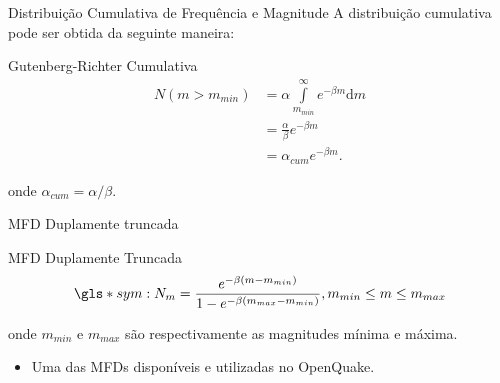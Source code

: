 \documentclass[ucs,8pt]{beamer}
\begin{document}
\begin{frame}{Distribuição Cumulativa de Frequência e Magnitude}
A distribuição \alert{cumulativa} pode ser obtida da seguinte maneira: 
	\begin{block}{Gutenberg-Richter Cumulativa}
		\begin{equation}
			\begin{split}
				N(m > m_{min}) &= \alpha \int\limits_{m_{min}}^{\infty}e^{-\beta m}\mathrm{d}m \\
							   &= \frac{\alpha}{\beta} e^{-\beta m} \\
							   &= \alpha_{cum} e^{-\beta m}.
			\end{split}
			\label{eq:gr_cum}
		\end{equation}
	\end{block}
	onde $\alpha_{cum} = \alpha / \beta $.
\end{frame}


\begin{frame}{MFD Duplamente truncada}
	\begin{block}{MFD Duplamente Truncada}
	\begin{equation}
			\gls*{sym:N_m} = \frac{e^{-\beta (m - m_{min})}}{1 -e^{-\beta (m_{max} - m_{min}) } } , m_{min} \leq m \leq m_{max}
		\label{eq:gr_dtr}
	\end{equation}
	\end{block}
	onde $m_{min}$ e $m_{max}$ são respectivamente as magnitudes mínima e máxima.

	\begin{itemize}
	  \item Uma das MFDs disponíveis e utilizadas no OpenQuake.
	\end{itemize}

\end{frame}
\end{document}
